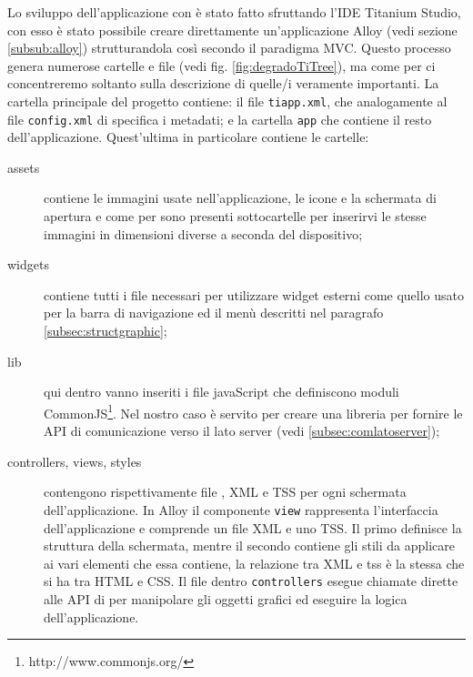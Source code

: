             Lo sviluppo dell'applicazione con \tisdk{} è stato fatto sfruttando
            l'IDE Titanium Studio, con esso è stato possibile creare direttamente
            un'applicazione Alloy (vedi sezione \ref{subsub:alloy}) strutturandola
            così secondo il paradigma MVC.
            Questo processo genera numerose cartelle e file (vedi fig. \ref{fig:degradoTiTree}),
            ma come per \pg{} ci concentreremo soltanto sulla descrizione di quelle/i veramente importanti.
            La cartella principale del progetto contiene: il file \texttt{tiapp.xml}, che
            analogamente al file \texttt{config.xml} di \pg{} specifica i
            metadati; e
            la cartella \texttt{app} che contiene il resto dell'applicazione.
            Quest'ultima in particolare contiene le cartelle:
            \begin{description}
                \item[assets] contiene le immagini usate nell'applicazione, le
                              icone e la schermata di apertura e come per \pg{}
                              sono presenti sottocartelle per inserirvi le stesse
                              immagini in dimensioni diverse a seconda del dispositivo;
                              \clearpage
                \item[widgets] contiene tutti i file necessari per utilizzare widget esterni
                               come quello usato per la barra di navigazione ed il menù descritti
                               nel paragrafo \ref{subsec:structgraphic};
                \item[lib] qui dentro vanno inseriti i file javaScript che definiscono
                           moduli CommonJS\footnote{http://www.commonjs.org/}. Nel
                           nostro caso è servito per creare una libreria per fornire
                           le API di comunicazione verso il lato server (vedi \ref{subsec:comlatoserver});
                \item[controllers, views, styles] contengono rispettivamente file
                            \js{}, XML e TSS per ogni schermata dell'applicazione.
                            In Alloy il componente \texttt{view} rappresenta l'interfaccia
                            dell'applicazione e comprende un file XML e uno TSS.
                            Il primo definisce la struttura della schermata, mentre il
                            secondo contiene gli stili da applicare ai vari elementi
                            che essa contiene, la relazione tra XML e tss è la stessa
                            che si ha tra HTML e CSS.
                            Il file dentro \texttt{controllers} esegue chiamate dirette
                            alle API di \tisdk{} per manipolare gli oggetti grafici
                            ed eseguire la logica dell'applicazione.
            \end{description}

